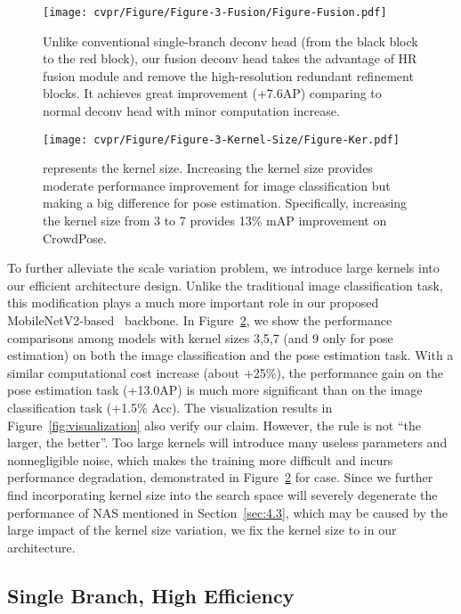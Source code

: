 \documentclass[10pt,twocolumn,letterpaper]{article}
\begin{document}
\begin{figure}
\centering
	\texttt{[image: cvpr/Figure/Figure-3-Fusion/Figure-Fusion.pdf]}
\caption{Unlike conventional single-branch deconv head (from the black block to the red block), our fusion deconv head takes the advantage of HR fusion module and remove the high-resolution redundant refinement blocks. It achieves great improvement (+7.6AP) comparing to normal deconv head with minor computation increase.}
\label{fig:4-fusion}
\end{figure}
 
\begin{figure}
\centering
	\texttt{[image: cvpr/Figure/Figure-3-Kernel-Size/Figure-Ker.pdf]}
\caption{ represents the kernel size. Increasing the kernel size provides moderate performance improvement for image classification but making a big difference for pose estimation. Specifically, increasing the kernel size from 3 to 7 provides 13\% mAP improvement on CrowdPose.}
\label{fig:4-kernel-size}
\end{figure}
 

To further alleviate the scale variation problem, we introduce large kernels into our efficient architecture design. Unlike the traditional image classification task, this modification plays a much more important role in our proposed MobileNetV2-based~\cite{sandler2018mobilenetv2} backbone. In Figure~\ref{fig:4-kernel-size}, we show the performance comparisons among models with kernel sizes 3,5,7 (and 9 only for pose estimation) on both the image classification and the pose estimation task. With a similar computational cost increase (about +25\%), the performance gain on the pose estimation task (+13.0AP) is much more significant than on the image classification task (+1.5\% Acc). The visualization results in Figure~\ref{fig:visualization} also verify our claim. However, the rule is not ``the larger, the better''. Too large kernels will introduce many useless parameters and nonnegligible noise, which makes the training more difficult and incurs performance degradation, demonstrated in Figure~\ref{fig:4-kernel-size} for  case.
Since we further find incorporating kernel size into the search space will severely degenerate the performance of NAS mentioned in Section~\ref{sec:4.3}, which may be caused by the large impact of the kernel size variation, we fix the kernel size to  in our architecture.

\subsection{Single Branch, High Efficiency} 
\end{document}
